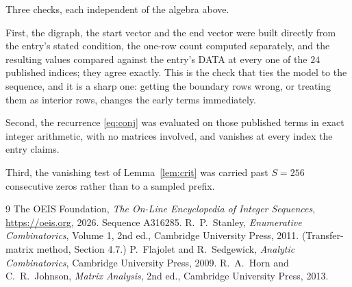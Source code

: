 \documentclass[11pt,a4paper]{article}
\theoremstyle{plain}
\theoremstyle{definition}
\begin{document}
Three checks, each independent of the algebra above.

First, the digraph, the start vector and the end vector were built directly from the
entry's stated condition, the one-row count computed separately, and the resulting values
compared against the entry's DATA at every one of the $24$ published indices; they
agree exactly. This is the check that ties the model to the sequence, and it is a sharp one:
getting the boundary rows wrong, or treating them as interior rows, changes the early terms
immediately.

Second, the recurrence \eqref{eq:conj} was evaluated on those published terms in exact
integer arithmetic, with no matrices involved, and vanishes at every index the entry claims.

Third, the vanishing test of Lemma~\ref{lem:crit} was carried past $S=256$ consecutive
zeros rather than to a sampled prefix.

\begin{thebibliography}{9}
 The OEIS Foundation, \emph{The On-Line Encyclopedia of Integer
Sequences}, \url{https://oeis.org}, 2026. Sequence A316285.
 R.~P.~Stanley, \emph{Enumerative Combinatorics}, Volume 1, 2nd ed.,
Cambridge University Press, 2011. (Transfer-matrix method, Section 4.7.)
 P.~Flajolet and R.~Sedgewick, \emph{Analytic Combinatorics}, Cambridge
University Press, 2009.
 R.~A.~Horn and C.~R.~Johnson, \emph{Matrix Analysis}, 2nd ed., Cambridge
University Press, 2013.
\end{thebibliography}
\end{document}
